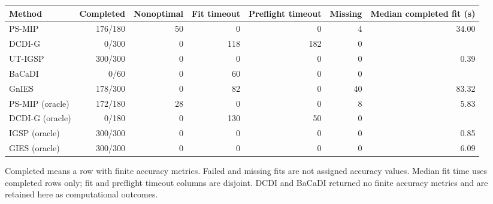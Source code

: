 \begingroup
\scriptsize
\setlength{\tabcolsep}{3pt}
\begin{tabular}{@{}lrrrrrr@{}}
\hline
Method & Completed & Nonoptimal & Fit timeout & Preflight timeout & Missing & Median completed fit (s) \\
\hline
PS-MIP & 176/180 & 50 & 0 & 0 & 4 & 34.00 \\
DCDI-G & 0/300 & 0 & 118 & 182 & 0 &  \\
UT-IGSP & 300/300 & 0 & 0 & 0 & 0 & 0.39 \\
BaCaDI & 0/60 & 0 & 60 & 0 & 0 &  \\
GnIES & 178/300 & 0 & 82 & 0 & 40 & 83.32 \\
PS-MIP (oracle) & 172/180 & 28 & 0 & 0 & 8 & 5.83 \\
DCDI-G (oracle) & 0/180 & 0 & 130 & 50 & 0 &  \\
IGSP (oracle) & 300/300 & 0 & 0 & 0 & 0 & 0.85 \\
GIES (oracle) & 300/300 & 0 & 0 & 0 & 0 & 6.09 \\
\hline
\end{tabular}
\par\smallskip\footnotesize Completed means a row with finite accuracy metrics. Failed and missing fits are not assigned accuracy values. Median fit time uses completed rows only; fit and preflight timeout columns are disjoint. DCDI and BaCaDI returned no finite accuracy metrics and are retained here as computational outcomes.
\endgroup
